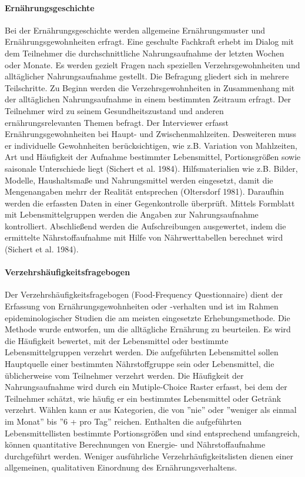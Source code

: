 \paragraph{Ernährungsgeschichte}

Bei der Ernährungsgeschichte werden allgemeine Ernährungsmuster und Ernährungsgewohnheiten erfragt. Eine geschulte Fachkraft erhebt im Dialog mit dem Teilnehmer die durchschnittliche Nahrungsaufnahme der letzten Wochen oder Monate. Es werden gezielt Fragen nach speziellen Verzehrsgewohnheiten und alltäglicher Nahrungsaufnahme gestellt. Die Befragung gliedert sich in mehrere Teilschritte. Zu Beginn werden die Verzehrsgewohnheiten in Zusammenhang mit der alltäglichen Nahrungsaufnahme in einem bestimmten Zeitraum erfragt. Der Teilnehmer wird zu seinem Gesundheitszustand und anderen ernährungsrelevanten Themen befragt. Der Interviewer erfasst Ernährungsgewohnheiten bei Haupt- und Zwischenmahlzeiten. Desweiteren muss er  individuelle Gewohnheiten berücksichtigen, wie z.B. Variation von Mahlzeiten, Art und Häufigkeit der Aufnahme bestimmter Lebensmittel, Portionsgrößen sowie saisonale Unterschiede liegt (Sichert et al. 1984). Hilfsmaterialien wie z.B. Bilder, Modelle, Haushaltsmaße und Nahrungsmittel werden eingesetzt, damit die Mengenangaben mehrr der Realität entsprechen (Oltersdorf 1981). Daraufhin werden die erfassten Daten in einer Gegenkontrolle überprüft. Mittels Formblatt mit Lebensmittelgruppen werden die Angaben zur Nahrungsaufnahme kontrolliert. Abschließend werden die Aufschreibungen ausgewertet, indem die ermittelte Nährstoffaufnahme mit Hilfe von Nährwerttabellen berechnet wird (Sichert et al. 1984). \cite{sichert1984ernaehrungs}

\paragraph{Verzehrshäufigkeitsfragebogen}

Der Verzehrshäufigkeitsfragebogen (Food-Frequency Questionnaire) dient der Erfassung von Ernährungsgewohnheiten oder -verhalten und ist im Rahmen epideminologischer Studien die am meisten eingesetzte Erhebungsmethode. \cite{kirch2006prävention} Die Methode wurde entworfen, um die alltägliche Ernährung zu beurteilen. Es wird die Häufigkeit bewertet, mit der Lebensmittel oder bestimmte Lebensmittelgruppen verzehrt werden. Die aufgeführten Lebensmittel sollen Hauptquelle einer bestimmten Nährstoffgruppe sein oder Lebensmittel, die üblicherweise vom Teilnehmer verzehrt werden. Die Häufigkeit der Nahrungsaufnahme wird durch ein Mutiple-Choice Raster erfasst, bei dem der Teilnehmer schätzt, wie häufig er ein bestimmtes Lebensmittel oder Getränk verzehrt. Wählen kann er aus Kategorien, die von ''nie'' oder ''weniger als einmal im Monat'' bis ''6 + pro Tag'' reichen. Enthalten die aufgeführten Lebensmittellisten bestimmte Portionsgrößen und sind entsprechend umfangreich, können quantitative Berechnungen von Energie- und Nährstoffaufnahme durchgeführt werden. Weniger ausführliche Verzehrhäufigkeitslisten dienen einer allgemeinen, qualitativen Einordnung des Ernährungsverhaltens. 

